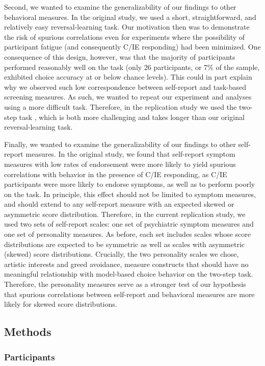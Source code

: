 \documentclass[a4paper,notitlepage,12pt]{article}
\begin{document}
Second, we wanted to examine the generalizability of our findings to other behavioral measures. In the original study, we used a short, straightforward, and relatively easy reversal-learning task. Our motivation then was to demonstrate the risk of spurious correlations even for experiments where the possibility of participant fatigue (and consequently C/IE responding) had been minimized. One consequence of this design, however, was that the majority of participants performed reasonably well on the task (only 26 participants, or 7\% of the sample, exhibited choice accuracy at or below chance levels). This could in part explain why we observed such low correspondence between self-report and task-based screening measures. As such, we wanted to repeat our experiment and analyses using a more difficult task. Therefore, in the replication study we used the two-step task \cite{daw2011model}, which is both more challenging and takes longer than our original reversal-learning task. 

Finally, we wanted to examine the generalizability of our findings to other self-report measures. In the original study, we found that self-report symptom measures with low rates of endorsement were more likely to yield spurious correlations with behavior in the presence of C/IE responding, as C/IE participants were more likely to endorse symptoms, as well as to perform poorly on the task. In principle, this effect should not be limited to symptom measures, and should extend to any self-report measure with an expected skewed or asymmetric score distribution. Therefore, in the current replication study, we used two sets of self-report scales: one set of psychiatric symptom measures and one set of personality measures. As before, each set includes scales whose score distributions are expected to be symmetric as well as scales with asymmetric (skewed) score distributions. Crucially, the two personality scales we chose, artistic interests and greed avoidance, measure constructs that should have no meaningful relationship with model-based choice behavior on the two-step task. Therefore, the personality measures serve as a stronger test of our hypothesis that spurious correlations between self-report and behavioral measures are more likely for skewed score distributions. 

\subsection*{Methods}

\subsubsection*{Participants}
\end{document}
